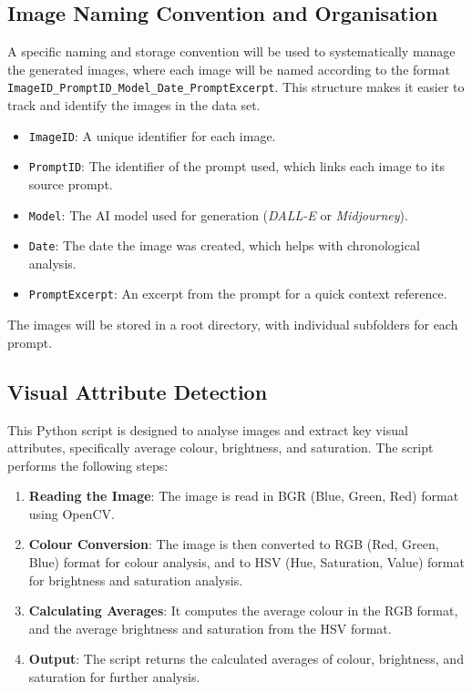 \subsection{Image Naming Convention and Organisation}

A specific naming and storage convention will be used to systematically manage the generated images, where each image will be named according to the format \texttt{ImageID\_PromptID\_Model\_Date\_PromptExcerpt}. This structure makes it easier to track and identify the images in the data set.

\begin{itemize}
    \item \texttt{ImageID}: A unique identifier for each image.
    \item \texttt{PromptID}: The identifier of the prompt used, which links each image to its source prompt.
    \item \texttt{Model}: The AI model used for generation (\textit{DALL-E} or \textit{Midjourney}).
    \item \texttt{Date}: The date the image was created, which helps with chronological analysis.
    \item \texttt{PromptExcerpt}: An excerpt from the prompt for a quick context reference.
\end{itemize}

The images will be stored in a root directory, with individual subfolders for each prompt.

\subsection{Visual Attribute Detection}
\label{subsec:visual-attribute-detection}

This Python script is designed to analyse images and extract key visual attributes, specifically average colour, brightness, and saturation. The script performs the following steps:

\begin{enumerate}
    \item \textbf{Reading the Image}: The image is read in BGR (Blue, Green, Red) format using OpenCV.
    \item \textbf{Colour Conversion}: The image is then converted to RGB (Red, Green, Blue) format for colour analysis, and to HSV (Hue, Saturation, Value) format for brightness and saturation analysis.
    \item \textbf{Calculating Averages}: It computes the average colour in the RGB format, and the average brightness and saturation from the HSV format.
    \item \textbf{Output}: The script returns the calculated averages of colour, brightness, and saturation for further analysis.
\end{enumerate}

